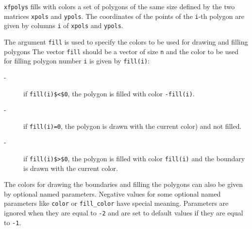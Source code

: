 \begin{mandescription}
  \verb!xfpolys! fills with colors a set of polygons of the same size defined by
  the two matrices \verb!xpols! and \verb!ypols!. The coordinates of the points of the
  \verb!i!-th polygon are given by columns \verb!i! of \verb!xpols! and \verb!ypols!.



  The argument \verb!fill! is used to specify the colors to be used for drawing and filling polygons
  The vector \verb!fill! should be a vector of size \verb!n! and the color to be used for filling
  polygon number \verb!i! is given by \verb!fill(i)!:
  \begin{description}
  \item[-] if \verb!fill(i)$<$0!, the polygon is filled with color \verb!-fill(i)!.
  \item[-] if \verb!fill(i)=0!, the polygon is drawn with the current color) and not filled.
  \item[-] if \verb!fill(i)$>$0!, the polygon is filled with color \verb!fill(i)! and
    the boundary is drawn with the current color.
  \end{description}

  The colors for drawing the boundaries and filling the polygons can also be given by
  optional named parameters. Negative values for some optional named parameters like \verb!color! or
  \verb!fill_color! have special meaning. Parameters are ignored when they are equal to \verb!-2!
  and are set to default values if they are equal to \verb!-1!.
\end{mandescription}

